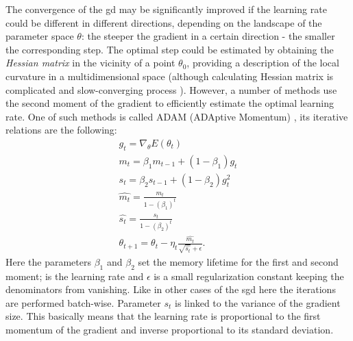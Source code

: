 The convergence of the \gls{gd} may be significantly improved if the learning rate could be different in different directions, depending on the landscape of the parameter space $\theta$: the steeper the gradient in a certain direction - the smaller the corresponding step. The optimal step could be estimated by obtaining the \textit{Hessian matrix} in the vicinity of a point $\theta_0$, providing a description of the local curvature in a multidimensional space (although calculating Hessian matrix is complicated and slow-converging process \cite{LeCun1998}). However, a number of methods use the second moment of the gradient to efficiently estimate the optimal learning rate. One of such methods is called ADAM (ADAptive Momentum) \cite{kingma2014method}, its iterative relations are the following:
\begin{equation}
\begin{array}{lcl} 
g_t=\nabla_{\theta}E(\theta_t)\\
m_t=\beta_1 m_{t-1}+(1-\beta_1)g_t\\
s_t=\beta_2 s_{t-1} + (1-\beta_2)g_t^2\\
\hat{m_t}=\frac{m_t}{1-(\beta_1)^t}\\
\hat{s_t}=\frac{s_t}{1-(\beta_2)^t}\\
\theta_{t+1}=\theta_t-\eta_t\frac{\hat{m_t}}{\sqrt{\hat{s_t}}+\epsilon}.
\end{array} 
\end{equation}
Here the parameters $\beta_1$ and $\beta_2$ set the memory lifetime for the first and second moment; \eta is the learning rate and $\epsilon$ is a small regularization constant keeping the denominators from vanishing. Like in other cases of the \gls{sgd} here the iterations are performed batch-wise. Parameter $s_t$ is linked to the variance of the gradient size. This basically means that the learning rate is proportional to the first momentum of the gradient and inverse proportional to its standard deviation.
